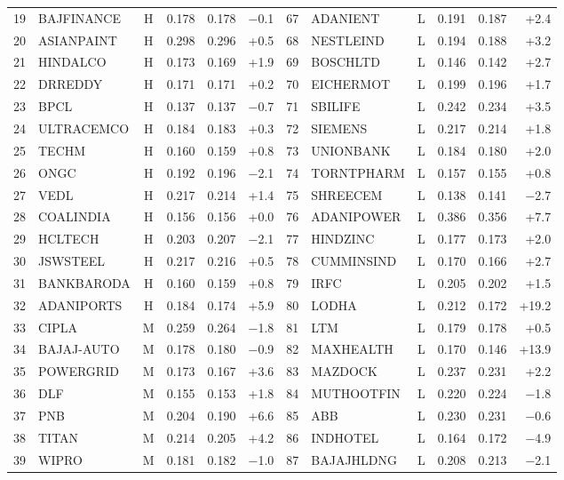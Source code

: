 \begin{table}[H]
\begin{adjustbox}{max width=\textwidth}
\begin{tabular}{rlcrrr|rlcrrr}
19 & BAJFINANCE & H & 0.178 & 0.178 & $-$0.1 & 67 & ADANIENT & L & 0.191 & 0.187 & +2.4 \\
20 & ASIANPAINT & H & 0.298 & 0.296 & +0.5 & 68 & NESTLEIND & L & 0.194 & 0.188 & +3.2 \\
21 & HINDALCO & H & 0.173 & 0.169 & +1.9 & 69 & BOSCHLTD & L & 0.146 & 0.142 & +2.7 \\
22 & DRREDDY & H & 0.171 & 0.171 & +0.2 & 70 & EICHERMOT & L & 0.199 & 0.196 & +1.7 \\
23 & BPCL & H & 0.137 & 0.137 & $-$0.7 & 71 & SBILIFE & L & 0.242 & 0.234 & +3.5 \\
24 & ULTRACEMCO & H & 0.184 & 0.183 & +0.3 & 72 & SIEMENS & L & 0.217 & 0.214 & +1.8 \\
25 & TECHM & H & 0.160 & 0.159 & +0.8 & 73 & UNIONBANK & L & 0.184 & 0.180 & +2.0 \\
26 & ONGC & H & 0.192 & 0.196 & $-$2.1 & 74 & TORNTPHARM & L & 0.157 & 0.155 & +0.8 \\
27 & VEDL & H & 0.217 & 0.214 & +1.4 & 75 & SHREECEM & L & 0.138 & 0.141 & $-$2.7 \\
28 & COALINDIA & H & 0.156 & 0.156 & +0.0 & 76 & ADANIPOWER & L & 0.386 & 0.356 & +7.7 \\
29 & HCLTECH & H & 0.203 & 0.207 & $-$2.1 & 77 & HINDZINC & L & 0.177 & 0.173 & +2.0 \\
30 & JSWSTEEL & H & 0.217 & 0.216 & +0.5 & 78 & CUMMINSIND & L & 0.170 & 0.166 & +2.7 \\
31 & BANKBARODA & H & 0.160 & 0.159 & +0.8 & 79 & IRFC & L & 0.205 & 0.202 & +1.5 \\
32 & ADANIPORTS & H & 0.184 & 0.174 & +5.9 & 80 & LODHA & L & 0.212 & 0.172 & +19.2 \\
33 & CIPLA & M & 0.259 & 0.264 & $-$1.8 & 81 & LTM & L & 0.179 & 0.178 & +0.5 \\
34 & BAJAJ-AUTO & M & 0.178 & 0.180 & $-$0.9 & 82 & MAXHEALTH & L & 0.170 & 0.146 & +13.9 \\
35 & POWERGRID & M & 0.173 & 0.167 & +3.6 & 83 & MAZDOCK & L & 0.237 & 0.231 & +2.2 \\
36 & DLF & M & 0.155 & 0.153 & +1.8 & 84 & MUTHOOTFIN & L & 0.220 & 0.224 & $-$1.8 \\
37 & PNB & M & 0.204 & 0.190 & +6.6 & 85 & ABB & L & 0.230 & 0.231 & $-$0.6 \\
38 & TITAN & M & 0.214 & 0.205 & +4.2 & 86 & INDHOTEL & L & 0.164 & 0.172 & $-$4.9 \\
39 & WIPRO & M & 0.181 & 0.182 & $-$1.0 & 87 & BAJAJHLDNG & L & 0.208 & 0.213 & $-$2.1 \\

\end{tabular}
\end{adjustbox}
\end{table}
